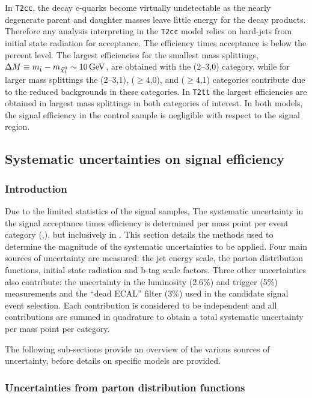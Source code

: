 In \verb!T2cc!, the decay c-quarks become virtually undetectable as 
the nearly degenerate parent and daughter masses leave little energy for the decay 
products. Therefore any analysis interpreting in the \verb!T2cc! model 
relies on hard-\Pt jets from initial state radiation for acceptance. The 
efficiency times acceptance is below the percent level. The largest 
efficiencies for the smallest mass splittings, $\Delta M \equiv m_{\tilde{\rm t}} - m_{\tilde{\chi}_1^{0}} \sim10\,\text{Ge\hspace{-.08em}V}$, 
are obtained with the (2--3,0) category, while for larger mass splittings 
the (2--3,1), ($\geq 4$,0), and ($\geq 4$,1) categories contribute 
due to the reduced backgrounds in these categories. In \verb!T2tt! the largest
efficiencies are obtained in largest mass splittings in both categories of interest. 
In both models, the signal efficiency in the \mj control sample is negligible 
with respect to the signal region. 

\clearpage
\subsection{Systematic uncertainties on signal efficiency\label{sec:sms-syst}}

\subsubsection{Introduction} 

Due to the limited statistics of the signal samples, The systematic uncertainty in the signal 
acceptance times efficiency is determined per mass point per event 
category (\njet,\nb), but inclusively in \scalht . This section details the methods 
used to determine the magnitude of the systematic uncertainties to be applied. 
Four main sources of uncertainty are measured: the jet energy scale,
the parton distribution functions, initial state radiation and b-tag scale
factors. Three other uncertainties also contribute: the uncertainty in the luminosity (2.6\%) and
trigger (5\%) measurements and the ``dead ECAL'' filter (3\%) used in the candidate signal
event selection. Each contribution is considered to be independent 
and all contributions are summed in quadrature to obtain a total 
systematic uncertainty per mass point per category.

The following sub-sections provide an overview of the various sources of
uncertainty, before details on specific models are provided. 

\subsubsection{Uncertainties from parton distribution functions\label{sec:pdf-sets}}

